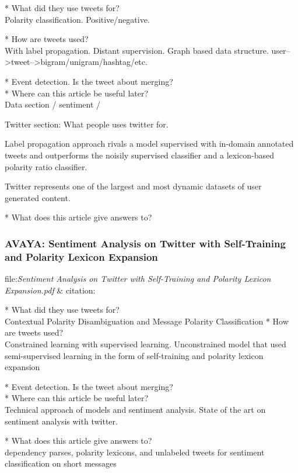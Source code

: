 * What did they use tweets for?\\
Polarity classification. Positive/negative. 

* How are tweets used?\\
With label propagation.
Distant supervision. 
Graph based data structure. 
user-->tweet-->bigram/unigram/hashtag/etc.  

* Event detection. Is the tweet about merging? \\
* Where can this article be useful later? \\
Data section / sentiment / 

Twitter section: What people uses twitter for. 

Label propagation approach rivals a model supervised with in-domain annotated tweets and outperforms the noisily supervised classifier and a lexicon-based polarity ratio classifier. \cite[]{sperious11}

Twitter represents one of the largest and most dynamic datasets of user
generated content.


* What does this article give answers to?\\


\subsubsection{AVAYA: Sentiment Analysis on Twitter with Self-Training and Polarity Lexicon Expansion}
file:\textit{Sentiment Analysis on Twitter with Self-Training and Polarity
Lexicon Expansion.pdf} & citation:\cite[]{becker13}

* What did they use tweets for?\\
Contextual Polarity Disambiguation and Message Polarity Classiﬁcation
* How are tweets used?\\
Constrained learning with supervised learning. 
Unconstrained model that used semi-supervised learning in the form of self-training and polarity lexicon expansion

* Event detection. Is the tweet about merging? \\
* Where can this article be useful later? \\
Technical approach of models and sentiment analysis.
State of the art on sentiment analysis with twitter. 

* What does this article give answers to?\\
dependency parses, polarity lexicons,
and unlabeled tweets for sentiment classification on
short messages

